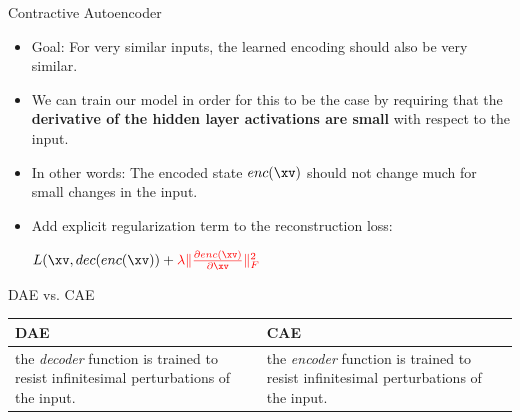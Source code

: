 \documentclass[11pt,compress,t,notes=noshow]{beamer}
\begin{document}
\begin{frame}[t]{Contractive Autoencoder}
   \begin{itemize}
      \item Goal: For very similar inputs, the learned encoding should also be very similar. 
      \item We can train our model in order for this to be the case by requiring that the \textbf{derivative of the hidden layer activations are small} with respect to the input. 
      \item In other words: The encoded state $enc(\xv)$ should not change much for small changes in the input. 
      \item Add explicit regularization term to the reconstruction loss:\\
           \begin{center}
       $L(\xv, dec(enc(\xv)) + \color{red}{\lambda \Vert \frac{\partial enc(\xv)}{\partial \xv} \Vert^2_F}$ 
   \end{center}
   \end{itemize} 

\end{frame}


\begin{frame}[t]{DAE vs. CAE}
    \begin{table}[h!]
        \centering
        \label{tab:}
        \begin{tabular}{p{5cm}|p{5cm}}
            \textbf{DAE} & \textbf{CAE}\\
            \hline
            the \textit{decoder} function is trained to resist infinitesimal perturbations of the input. & the \textit{encoder} function is trained to resist infinitesimal perturbations of the input.
        \end{tabular}
    \end{table}
\end{frame}
\end{document}
